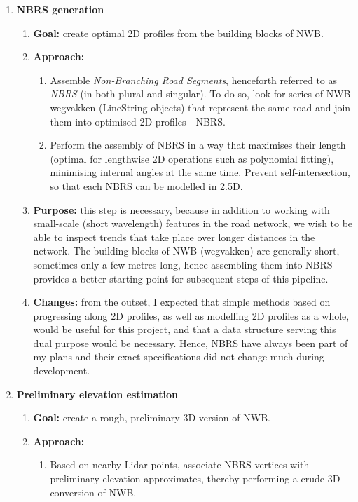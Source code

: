 \begin{enumerate}
    \item \textbf{NBRS generation}
    \begin{enumerate}
        \item \textbf{Goal:} create optimal 2D profiles from the building blocks of NWB.
        \item \textbf{Approach:}
        \begin{enumerate}
            \item Assemble \textit{Non-Branching Road Segments}, henceforth referred to as \textit{NBRS} (in both plural and singular). To do so, look for series of NWB wegvakken (LineString objects) that represent the same road and join them into optimised 2D profiles - NBRS.
            \item Perform the assembly of NBRS in a way that maximises their length (optimal for lengthwise 2D operations such as polynomial fitting), minimising internal angles at the same time. Prevent self-intersection, so that each NBRS can be modelled in 2.5D.
        \end{enumerate}
        \item \textbf{Purpose:} this step is necessary, because in addition to working with small-scale (short wavelength) features in the road network, we wish to be able to inspect trends that take place over longer distances in the network. The building blocks of NWB (wegvakken) are generally short, sometimes only a few metres long, hence assembling them into NBRS provides a better starting point for subsequent steps of this pipeline.
        \item \textbf{Changes:} from the outset, I expected that simple methods based on progressing along 2D profiles, as well as modelling 2D profiles as a whole, would be useful for this project, and that a data structure serving this dual purpose would be necessary. Hence, NBRS have always been part of my plans and their exact specifications did not change much during development.
    \end{enumerate}
    \item \textbf{Preliminary elevation estimation}
    \begin{enumerate}
        \item \textbf{Goal:} create a rough, preliminary 3D version of NWB.
        \item \textbf{Approach:}
        \begin{enumerate}
            \item Based on nearby Lidar points, associate NBRS vertices with preliminary elevation approximates, thereby performing a crude 3D conversion of NWB.

\end{enumerate}
\end{enumerate}
\end{enumerate}
